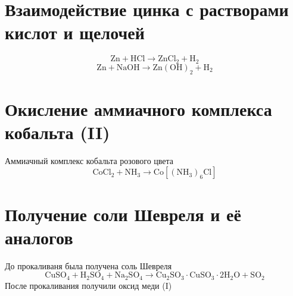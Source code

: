 \documentclass[a4paper,12pt]{article}
\begin{document}
\section{Взаимодействие цинка с растворами кислот и щелочей}
\begin{equation} 
\mathrm{Zn + HCl  \longrightarrow ZnCl_2 + H_2}
\end{equation}
\begin{equation} 
\mathrm{Zn + NaOH  \longrightarrow Zn(OH)_2 + H_2}
\end{equation}
\section{Окисление аммиачного комплекса кобальта (II)}
Аммиачный комплекс кобальта розового цвета
\begin{equation} 
\mathrm{CoCl_2 + NH_3 \longrightarrow Co[(NH_3)_6Cl]}
\end{equation}
\section{Получение соли Шевреля и её аналогов}
До прокаливаня была получена соль Шевреля
\begin{equation} 
\mathrm{CuSO_4 + H_2SO_4 + Na_2SO_4 \longrightarrow Cu_2SO_3 \cdot CuSO_3 \cdot 2H_2O + SO_2}
\end{equation}
После прокаливания получили оксид меди (I)
\end{document}
